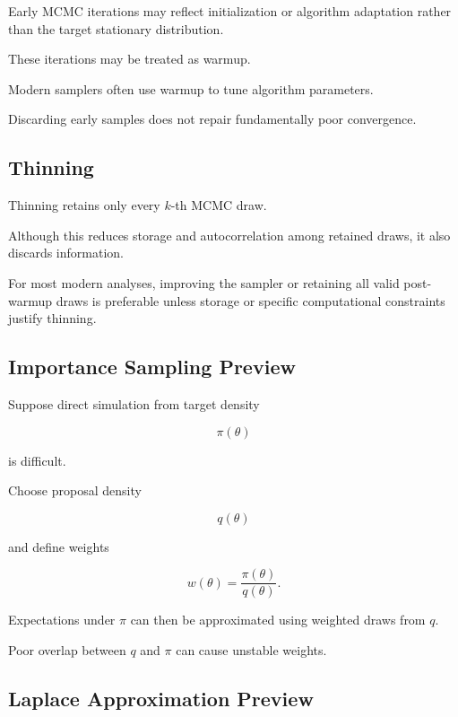 Early MCMC iterations may reflect initialization or algorithm adaptation
rather than the target stationary distribution.

These iterations may be treated as warmup.

Modern samplers often use warmup to tune algorithm parameters.

Discarding early samples does not repair fundamentally poor convergence.

\subsection{Thinning}
\label{subsec:mcmc-thinning}

Thinning retains only every \(k\)-th MCMC draw.

Although this reduces storage and autocorrelation among retained draws,
it also discards information.

For most modern analyses, improving the sampler or retaining all valid
post-warmup draws is preferable unless storage or specific computational
constraints justify thinning.

\subsection{Importance Sampling Preview}
\label{subsec:importance-sampling-bayes}

Suppose direct simulation from target density

\[
\pi(\theta)
\]

is difficult.

Choose proposal density

\[
q(\theta)
\]

and define weights

\[
\boxed{
w(\theta)
=
\frac{
\pi(\theta)
}{
q(\theta)
}.
}
\]

Expectations under \(\pi\) can then be approximated using weighted draws
from \(q\).

Poor overlap between \(q\) and \(\pi\) can cause unstable weights.

\subsection{Laplace Approximation Preview}
\label{subsec:laplace-approximation}

